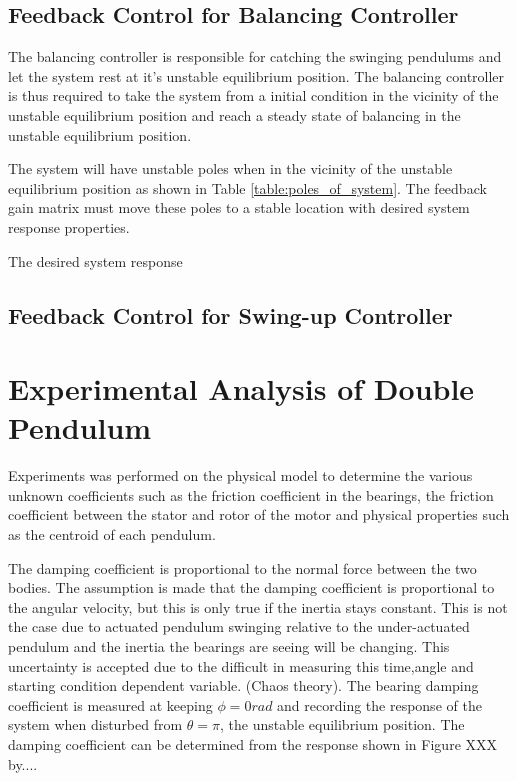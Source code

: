 \documentclass[a4paper,12pt]{article}
\begin{document}
	\subsection{Feedback Control for Balancing Controller}
	
	The balancing controller is responsible for catching the swinging pendulums and let the system rest at it's unstable equilibrium position. The balancing controller is thus required to take the system from a initial condition in the vicinity of the unstable equilibrium position and reach a steady state of balancing in the unstable equilibrium position.
	
	The system will have unstable poles when in the vicinity of the unstable equilibrium position as shown in Table \ref{table:poles_of_system}. The feedback gain matrix must move these poles to a stable location with desired system response properties.
	
	The desired system response 
	
	
	
	
	\subsection{Feedback Control for Swing-up Controller}
	
	
	\section{Experimental Analysis of Double Pendulum}
	
	Experiments was performed on the physical model to determine the various unknown coefficients such as the friction coefficient in the bearings, the friction coefficient between the stator and rotor of the motor and physical properties such as the centroid of each pendulum. 
	
	The damping coefficient is proportional to the normal force between the two bodies. The assumption is made that the damping coefficient is proportional to the angular velocity, but this is only true if the inertia stays constant. This is not the case due to actuated pendulum swinging relative to the under-actuated pendulum and the inertia the bearings are seeing will be changing. This uncertainty is accepted due to the difficult in measuring this time,angle and starting condition dependent variable. (Chaos theory). The bearing damping coefficient is measured at keeping $\phi = 0 rad$ and recording the response of the system when disturbed from $\theta = \pi$, the unstable equilibrium position. The damping coefficient can be determined from the response shown in Figure XXX by....
	
\end{document}
